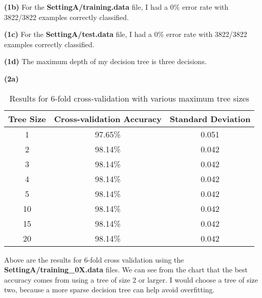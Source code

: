 \documentclass[11pt]{article}
\renewcommand\part[1]{\vspace{.10in}\textbf{(#1)}}
\begin{document}
\part{1b} For the \textbf{SettingA/training.data} file, I had a $0\%$ error rate with 3822/3822 examples correctly classified.


\part{1c} For the \textbf{SettingA/test.data} file, I had a $0\%$ error rate with 3822/3822 examples correctly classified.


\part{1d} The maximum depth of my decision tree is three decisions.


\part{2a}
\begin{table}[H]
\centering
\begin{tabular}{| c | c | c |}
\hline
Tree Size& Cross-validation Accuracy & Standard Deviation\\
\hline
1 & 97.65\% & 0.051\\
2 & 98.14\% & 0.042\\
3 & 98.14\% & 0.042\\
4 & 98.14\% & 0.042\\
5 & 98.14\% & 0.042\\
10 & 98.14\% & 0.042\\
15 & 98.14\% & 0.042\\
20 & 98.14\% & 0.042\\
\hline
\end{tabular}
\caption{Results for 6-fold cross-validation with various maximum tree sizes}
\end{table}
Above are the results for 6-fold cross validation using the \textbf{SettingA/training\_0X.data} files. We can see from the chart that the best accuracy comes from using a tree of size 2 or larger. I would choose a tree of size two, because a more sparse decision tree can help avoid overfitting.
\end{document}
